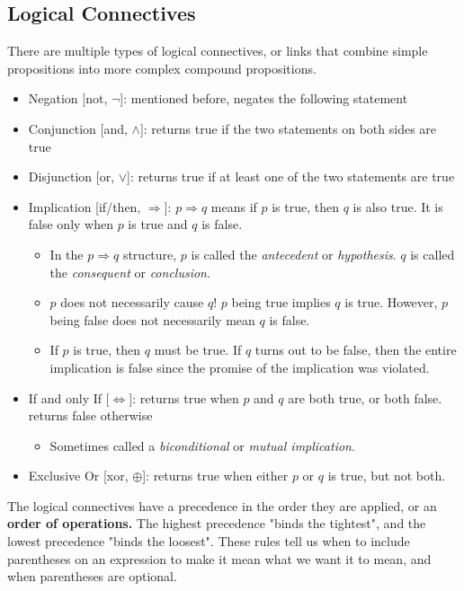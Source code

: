 \documentclass[10pt]{article}
\begin{document}
\subsection*{Logical Connectives}
There are multiple types of logical connectives, or links that combine simple propositions into more complex compound propositions.
\begin{itemize}
	\item Negation [not, $\neg$]: mentioned before, negates the following statement
	\item Conjunction [and, $\land$]: returns true if the two statements on both sides are true
	\item Disjunction [or, $\lor$]: returns true if at least one of the two statements are true
	\item Implication [if/then, $\Rightarrow$]: $p \Rightarrow q$ means if $p$ is true, then $q$ is also true.  It is false only when $p$ is true and $q$ is false.
	\begin{itemize}
    	\item In the $p \Rightarrow q$ structure, $p$ is called the \textit{antecedent} or \textit{hypothesis}.  $q$ is called the \textit{consequent} or \textit{conclusion}.
    	\item $p$ does not necessarily cause $q$!  $p$ being true implies $q$ is true.  However, $p$ being false does not necessarily mean $q$ is false.
    	\item If $p$ is true, then $q$ must be true.  If $q$ turns out to be false, then the entire implication is false since the promise of the implication was violated.
    \end{itemize}
    \item If and only If [$\Leftrightarrow$]: returns true when $p$ and $q$ are both true, or both false.  returns false otherwise
    \begin{itemize}
	    \item Sometimes called a \textit{biconditional} or \textit{mutual implication}.
    \end{itemize}
    \item Exclusive Or [xor, $\oplus$]: returns true when either $p$ or $q$ is true, but not both.
\end{itemize}
The logical connectives have a precedence in the order they are applied, or an \textbf{order of operations.}  The highest precedence "binds the tightest", and the lowest precedence "binds the loosest".  These rules tell us when to include parentheses on an expression to make it mean what we want it to mean, and when parentheses are optional.
\end{document}
